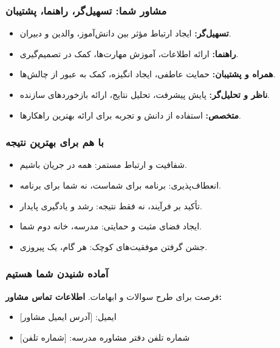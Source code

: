 \documentclass[aspectratio=169]{beamer}
\begin{document}
\begin{frame}
  \frametitle{مشاور شما: تسهیل‌گر، راهنما، پشتیبان}
  \begin{itemize}
    \item \textbf{تسهیل‌گر:} ایجاد ارتباط مؤثر بین دانش‌آموز، والدین و دبیران.
    \item \textbf{راهنما:} ارائه اطلاعات، آموزش مهارت‌ها، کمک در تصمیم‌گیری.
    \item \textbf{همراه و پشتیبان:} حمایت عاطفی، ایجاد انگیزه، کمک به عبور از چالش‌ها.
    \item \textbf{ناظر و تحلیل‌گر:} پایش پیشرفت، تحلیل نتایج، ارائه بازخوردهای سازنده.
    \item \textbf{متخصص:} استفاده از دانش و تجربه برای ارائه بهترین راهکارها.
  \end{itemize}
\end{frame}

\begin{frame}
  \frametitle{با هم برای بهترین نتیجه}
  \begin{itemize}
    \item شفافیت و ارتباط مستمر: همه در جریان باشیم.
    \item انعطاف‌پذیری: برنامه برای شماست، نه شما برای برنامه.
    \item تأکید بر فرآیند، نه فقط نتیجه: رشد و یادگیری پایدار.
    \item ایجاد فضای مثبت و حمایتی: مدرسه، خانه دوم شما.
    \item جشن گرفتن موفقیت‌های کوچک: هر گام، یک پیروزی.
  \end{itemize}
\end{frame}

\begin{frame}
  \frametitle{آماده شنیدن شما هستیم}
  \Large %
  \centering
  فرصت برای طرح سوالات و ابهامات.
  \bigskip
  \normalsize %
  \textbf{اطلاعات تماس مشاور:}
  \begin{itemize}
      \item ایمیل: [آدرس ایمیل مشاور]
      \item شماره تلفن دفتر مشاوره مدرسه: [شماره تلفن]
  \end{itemize}
  \vfill %
\end{frame}
\end{document}
